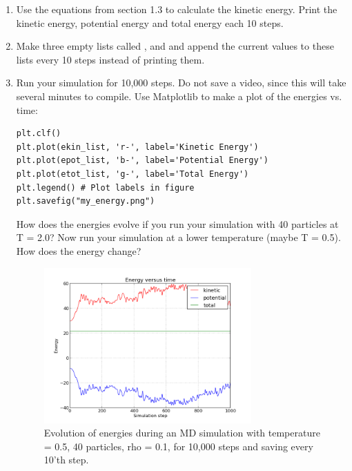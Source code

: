 \documentclass{article}
\begin{document}
\begin{enumerate}[resume]

    \item Use the equations from section 1.3 to calculate the kinetic energy.
        Print the kinetic energy, potential energy and total energy each 10 steps.

    \item Make three empty lists called ,  and  and append the current values to these lists every 10 steps instead of printing them.

    \item Run your simulation for 10,000 steps.
        Do not save a video, since this will take several minutes to compile.
        Use Matplotlib to make a plot of the energies vs. time:

\begin{lstlisting}
plt.clf()
plt.plot(ekin_list, 'r-', label='Kinetic Energy')
plt.plot(epot_list, 'b-', label='Potential Energy')
plt.plot(etot_list, 'g-', label='Total Energy')
plt.legend() # Plot labels in figure
plt.savefig("my_energy.png")
\end{lstlisting}

    How does the energies evolve if you run your simulation with 40 particles at T = 2.0?
    Now run your simulation at a lower temperature (maybe T = 0.5).
    How does the energy change?

    \begin{figure}[h!]
        \begin{center}
            \includegraphics[width=0.75\textwidth]{energy.png}
            \caption{
                Evolution of energies during an MD simulation with
                temperature = 0.5, 40 particles, rho = 0.1, for 10,000 steps
                and saving every 10'th step.
            }
            \label{fig:energies}
        \end{center}
    \end{figure}



\end{enumerate}
\end{document}
